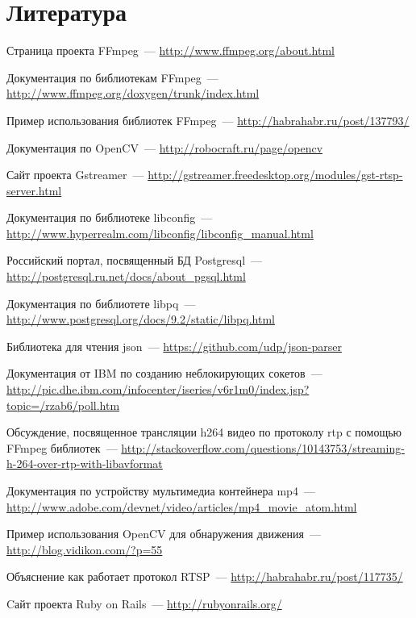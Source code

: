 \chapter*{Литература}
\renewcommand{\bibname}{Список источников}
\begin{thebibliography}{2013}

  Страница проекта FFmpeg~---
  \url{http://www.ffmpeg.org/about.html}

  Документация по библиотекам FFmpeg~---
  \url{http://www.ffmpeg.org/doxygen/trunk/index.html}

  Пример использования библиотек FFmpeg~---
  \url{http://habrahabr.ru/post/137793/}

  Документация по OpenCV~---
  \url{http://robocraft.ru/page/opencv}
  
  Сайт проекта Gstreamer~---
  \url{http://gstreamer.freedesktop.org/modules/gst-rtsp-server.html}
  
  Документация по библиотеке libconfig~---
  \url{http://www.hyperrealm.com/libconfig/libconfig_manual.html}

  Российский портал, посвященный БД Postgresql~---
  \url{http://postgresql.ru.net/docs/about_pgsql.html}

  Документация по библиотете libpq~---
  \url{http://www.postgresql.org/docs/9.2/static/libpq.html}

  Библиотека для чтения json~---
  \url{https://github.com/udp/json-parser}

  Документация от IBM по созданию неблокирующих сокетов~---
  \url{http://pic.dhe.ibm.com/infocenter/iseries/v6r1m0/index.jsp?topic=/rzab6/poll.htm}

  Обсуждение, посвященное трансляции h264 видео по протоколу rtp с помощью FFmpeg библиотек~---
  \url{http://stackoverflow.com/questions/10143753/streaming-h-264-over-rtp-with-libavformat}

  Документация по устройству мультимедиа контейнера mp4~---
  \url{http://www.adobe.com/devnet/video/articles/mp4_movie_atom.html}

  Пример использования OpenCV для обнаружения движения~---
  \url{http://blog.vidikon.com/?p=55}

  Объяснение как работает протокол RTSP~---
  \url{http://habrahabr.ru/post/117735/}

  Cайт проекта Ruby on Rails~---
  \url{http://rubyonrails.org/}


\end{thebibliography}
